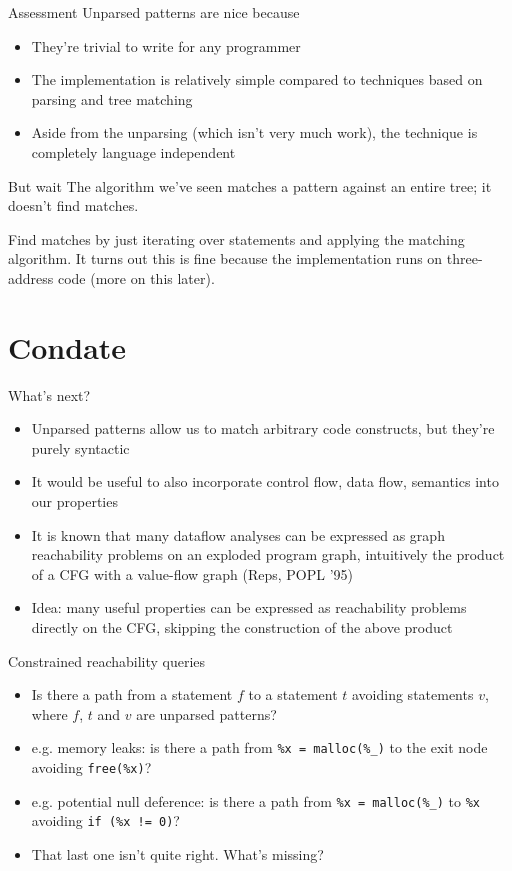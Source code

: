 \documentclass{beamer}
\begin{document}
\begin{frame}{Assessment}
Unparsed patterns are nice because
\begin{itemize}
\item They're trivial to write for any programmer
\item The implementation is relatively simple compared to techniques
based on parsing and tree matching
\item Aside from the unparsing (which isn't very much work), the technique
is completely language independent
\end{itemize}
\end{frame}

\begin{frame}{But wait}
The algorithm we've seen matches a pattern against an entire tree; it
doesn't find matches.

Find matches by just iterating over statements and applying the matching
algorithm. It turns out this is fine because the implementation runs
on three-address code (more on this later).
\end{frame}

\section{Condate}
\begin{frame}{What's next?}
\begin{itemize}
\item Unparsed patterns allow us to match arbitrary code constructs, but
they're purely syntactic
\item It would be useful to also incorporate control flow, data flow, 
semantics into our properties
\item It is known that many dataflow analyses can be expressed as graph
reachability problems on an exploded program graph, intuitively the product
of a CFG with a value-flow graph (Reps, POPL '95)
\item Idea: many useful properties can be expressed as reachability problems
directly on the CFG, skipping the construction of the above product
\end{itemize}
\end{frame}

\begin{frame}{Constrained reachability queries}
\begin{itemize}
\item Is there a path from a statement $f$ to a statement $t$ avoiding
statements $v$, where $f$, $t$ and $v$ are unparsed patterns?
\item e.g. memory leaks: is there a path from {\tt \%x = malloc(\%\_)} to
the exit node avoiding {\tt free(\%x)}?
\pause
\item e.g. potential null deference: is there a path from {\tt \%x = malloc(\%\_)}
to {\tt *\%x} avoiding {\tt if (\%x != 0)}?
\pause
\item That last one isn't quite right. What's missing?
\end{itemize}
\end{frame}
\end{document}
